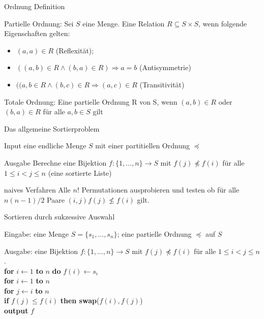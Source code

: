 \documentclass{beamer}
\begin{document}
\begin{frame}{Ordnung Definition}
 \begin{block}{ Partielle Ordnung:}
 Sei $S$ eine Menge. Eine Relation $R \subseteq S \times S$, wenn folgende Eigenschaften gelten:
    \begin{itemize}
        \item[(a)] $(a,a) \in R$  (Reflexität);
        \item[(b)]$((a,b) \in R \wedge (b,a) \in R) \Rightarrow a=b$  (Antisymmetrie)
	\item [(c)]$((a,b \in R \wedge (b,c) \in R \Rightarrow (a,c) \in R$  (Transitivität)
    \end{itemize}
\end{block}
\begin{block}{ Totale Ordnung:}
 Eine partielle Ordnung R von S, wenn $(a,b) \in R$ oder $(b,a) \in R$ für alle $a,b \in S$ gilt 
\end{block}
\end{frame}
\begin{frame}{Das allgemeine Sortierproblem}
\begin{block}{Input}
eine endliche Menge $S$ mit einer partitiellen Ordnung $\preceq$
\end{block}
\begin{block}{Ausgabe}
Berechne eine Bijektion $f \colon \{1,\dots,n\} \to S$ mit $f(j) \not\preceq f(i)$ für alle $1\le i<j \le n$ (eine sortierte Liste)
\end{block}
\begin{block}{naives Verfahren}
Alle $n!$ Permutationen ausprobieren und testen ob für alle $n(n-1)/2$ Paare $(i,j) $$  f(j) \not\le f(i)$ gilt.
\end{block}
\end{frame}
\begin{frame}{Sortieren durch sukzessive Auswahl}
\begin{block}{Eingabe:} eine Menge $S = \{s_1, \dots, s_n\}$; eine partielle Ordnung $\preceq $ auf $S$ 
\end{block}
    \begin{block}{Ausgabe:} eine Bijektion $f : \{1, \dots, n\} \to S$ mit $f(j) \not\preceq f(i)$ für alle $1 \leq i < j \leq n$.\\
    \textbf{for} {$i \leftarrow 1$ \textbf{to} $n$} \textbf{do} $f(i) \leftarrow s_i$\\
    \textbf{for} {$i \leftarrow 1$ \textbf{to} $n$}\\
        \textbf{for} {$j \leftarrow i$ \textbf{to} $n$}\\
            \textbf{if} {$f(j) \le f(i)$} 
                \textbf{then swap}($f(i), f(j)$)\\
            \textbf{output} $f$

    \end{block}

\end{frame}
\end{document}
